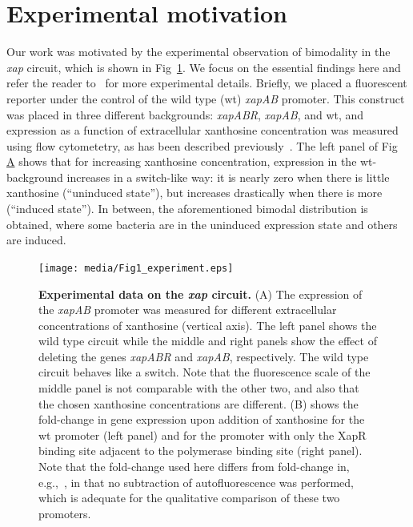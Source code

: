 \documentclass[10pt,letterpaper]{article}
\newcommand\subref[2]{%
	\def\myref{\getrefnumber{#1}}%
	\hyperref[#1]{\myref\mbox{#2}}%
}
\begin{document}
	\section*{Experimental motivation} \label{sec:experiment}
	Our work was motivated by the experimental observation of bimodality
	in the \emph{xap} circuit, which is shown in Fig~\ref{fig1:data}. We
	focus on the essential findings here and refer the reader
	to~ for more experimental details. Briefly, we
	placed a fluorescent reporter under the control of the wild type
	(wt) \emph{xapAB} promoter. This construct was placed in three
	different backgrounds: \textDelta\emph{xapABR},
	\textDelta\emph{xapAB}, and wt,
	and expression as a function of extracellular xanthosine concentration
	was measured using flow cytometetry, as has been described
	previously~\cite{RazoMejia2018}. The left panel of
	Fig~\subref{fig1:data}{A} shows that for increasing xanthosine
	concentration, expression in the wt-background increases in a
	switch-like way: it is nearly zero when there is little xanthosine
	(``uninduced state''), but increases drastically when there is more
	(``induced state''). In between, the aforementioned bimodal
	distribution is obtained, where some bacteria are in the uninduced
	expression state and others are induced.
		
	\begin{figure}%
		\centering
		\texttt{[image: media/Fig1\_experiment.eps]}
		\caption{{\bf Experimental data on the \emph{xap} circuit.}
		(A) The expression of the \emph{xapAB} promoter was measured for
		different extracellular concentrations of xanthosine (vertical axis).
		The left panel shows the wild type circuit while
		the middle and right panels show the effect of deleting
		the genes \emph{xapABR} and \emph{xapAB}, respectively.
		The wild type circuit behaves like a
		switch. Note that the fluorescence scale of the middle panel
		is not comparable with the other two,
		and also that the chosen xanthosine concentrations are different.
		(B) shows the fold-change in gene expression upon addition of
		xanthosine for the wt promoter (left panel)
		and for the promoter with only the XapR binding site adjacent
		to the polymerase binding site (right panel).
		Note that the fold-change used here differs from fold-change in,
		e.g.,~\cite{Garcia2011,RazoMejia2018,Chure2019},
		in that no subtraction of autofluorescence was performed,
		which is adequate for the qualitative comparison
		of these two promoters.
		}
		\label{fig1:data}
	\end{figure}
\end{document}

